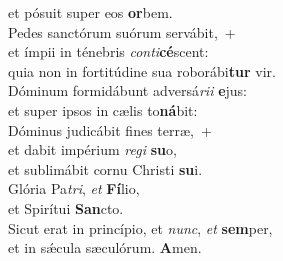 \oddverse et pósuit super eos \textbf{or}bem.\\
\evenverse Pedes sanctórum suórum servábit,~+\\
\evenverse  et ímpii in ténebris \textit{con}\textit{ti}\textbf{cé}scent:~\*\\
\evenverse quia non in fortitúdine sua roborábi\textbf{tur} vir.\\
\oddverse Dóminum formidábunt adversá\textit{ri}\textit{i} \textbf{e}jus:~\*\\
\oddverse et super ipsos in cælis to\textbf{ná}bit:\\
\evenverse Dóminus judicábit fines terræ,~+\\
\evenverse  et dabit impérium \textit{re}\textit{gi} \textbf{su}o,~\*\\
\evenverse et sublimábit cornu Christi \textbf{su}i.\\
\oddverse Glória Pa\textit{tri}, \textit{et} \textbf{Fí}lio,~\*\\
\oddverse et Spirítui \textbf{San}cto.\\
\evenverse Sicut erat in princípio, et \textit{nunc}, \textit{et} \textbf{sem}per,~\*\\
\evenverse et in sǽcula sæculórum. \textbf{A}men.\\
